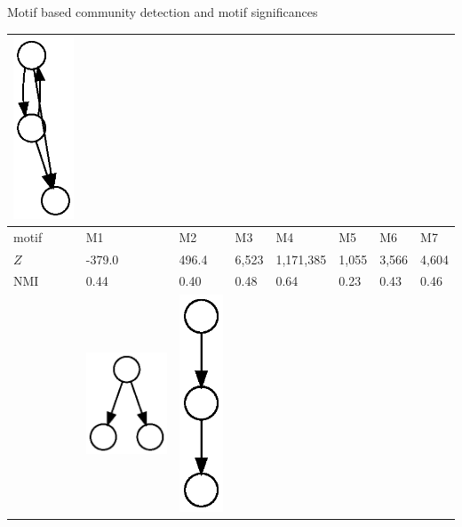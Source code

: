 \documentclass[unknownkeysallowed]{beamer}
\begin{document}
\begin{frame}{Motif based community detection and motif significances}
\begin{tabular}{l|lllllll}
    \includegraphics[height=0.10\textheight]{M7-plain} \\ \hline
    motif & M1 & M2 & M3 & M4 & M5 & M6 & M7
    \\ \hline
    $Z$ & -379.0 & 496.4 & 6,523 & 1,171,385 & 1,055 & 3,566 & 4,604 \\
    NMI & 0.44 & 0.40 & 0.48 & 0.64 & 0.23 & 0.43 & 0.46 \\ \hline \hline
    &
    \includegraphics[height=0.10\textheight]{M8-plain} &
    \includegraphics[height=0.10\textheight]{M9-plain} &

\end{tabular}
\end{frame}
\end{document}
